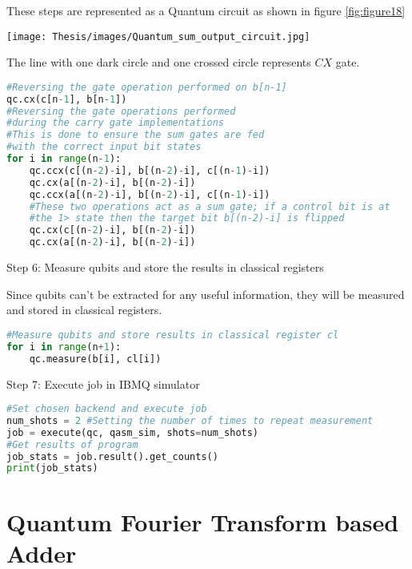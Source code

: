 \documentclass{cpp}
\begin{document}
These steps are represented as a Quantum circuit as shown in figure \ref{fig:figure18}

\begin{figure*}[htp]
    \centering
    \texttt{[image: Thesis/images/Quantum\_sum\_output\_circuit.jpg]}
    \caption{Quantum circuit for sum output}
    \label{fig:figure18}
\end{figure*}

The line with one dark circle and one crossed circle represents $CX$ gate.

\begin{lstlisting}[language=Python]
#Reversing the gate operation performed on b[n-1]
qc.cx(c[n-1], b[n-1])
#Reversing the gate operations performed 
#during the carry gate implementations
#This is done to ensure the sum gates are fed 
#with the correct input bit states
for i in range(n-1):
    qc.ccx(c[(n-2)-i], b[(n-2)-i], c[(n-1)-i])
    qc.cx(a[(n-2)-i], b[(n-2)-i])
    qc.ccx(a[(n-2)-i], b[(n-2)-i], c[(n-1)-i])
    #These two operations act as a sum gate; if a control bit is at                
    #the 1> state then the target bit b[(n-2)-i] is flipped
    qc.cx(c[(n-2)-i], b[(n-2)-i])
    qc.cx(a[(n-2)-i], b[(n-2)-i])
\end{lstlisting}

Step 6: Measure qubits and store the results in classical registers

Since qubits can't be extracted for any useful information, they will be measured and stored in classical registers.

\begin{lstlisting}[language=Python]
#Measure qubits and store results in classical register cl
for i in range(n+1):
    qc.measure(b[i], cl[i])
\end{lstlisting}

\newpage
Step 7: Execute job in IBMQ simulator

\begin{lstlisting}[language=Python]
#Set chosen backend and execute job
num_shots = 2 #Setting the number of times to repeat measurement
job = execute(qc, qasm_sim, shots=num_shots)
#Get results of program
job_stats = job.result().get_counts()
print(job_stats)
\end{lstlisting}

\section{Quantum Fourier Transform based Adder}
\end{document}
